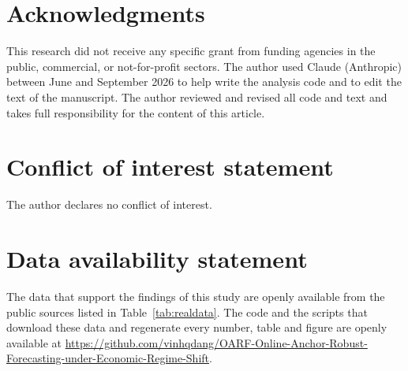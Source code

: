\documentclass[11pt]{article}
\theoremstyle{plain}
\theoremstyle{remark}
\begin{document}
\section*{Acknowledgments}
This research did not receive any specific grant from funding agencies in the
public, commercial, or not-for-profit sectors.
The author used Claude (Anthropic) between June and September 2026 to help
write the analysis code and to edit the text of the manuscript. The author
reviewed and revised all code and text and takes full responsibility for the
content of this article.

\section*{Conflict of interest statement}
The author declares no conflict of interest.

\section*{Data availability statement}
The data that support the findings of this study are openly available from the
public sources listed in Table~\ref{tab:realdata}. The code and the scripts that
download these data and regenerate every number, table and figure are openly
available at
\url{https://github.com/vinhqdang/OARF-Online-Anchor-Robust-Forecasting-under-Economic-Regime-Shift}.

\small


\end{document}
